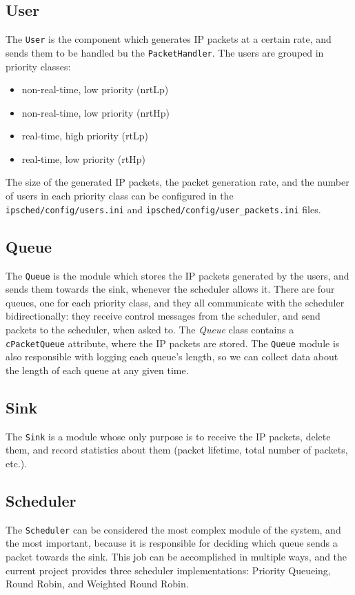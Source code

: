 \documentclass[12pt]{article}
\begin{document}
        \subsection{User}
        The \verb|User| is the component which generates IP packets at a certain rate, and sends them to be handled bu the \verb|PacketHandler|. The users are grouped in priority classes:
        \begin{itemize}
            \item{non-real-time, low priority (nrtLp)}
            \item{non-real-time, low priority (nrtHp)}
            \item{real-time, high priority (rtLp)}
            \item{real-time, low priority (rtHp)}
        \end{itemize}
        The size of the generated IP packets, the packet generation rate, and the number of users in each priority class can be configured in the \verb|ipsched/config/users.ini| and \verb|ipsched/config/user_packets.ini| files.

        \subsection{Queue}
        The \verb|Queue| is the module which stores the IP packets generated by the users, and sends them towards the sink, whenever the scheduler allows it. There are four queues, one for each priority class, and they all communicate with the scheduler bidirectionally: they receive control messages from the scheduler, and send packets to the scheduler, when asked to.
        The \textit{Queue} class contains a \verb|cPacketQueue| attribute, where the IP packets are stored.
        The \verb|Queue| module is also responsible with logging each queue's length, so we can collect data about the length of each queue at any given time.
        
        \subsection{Sink}
        The \verb|Sink| is a module whose only purpose is to receive the IP packets, delete them, and record statistics about them (packet lifetime, total number of packets, etc.).

        \subsection{Scheduler}
        The \verb|Scheduler| can be considered the most complex module of the system, and the most important, because it is responsible for deciding which queue sends a packet towards the sink. This job can be accomplished in multiple ways, and the current project provides three scheduler implementations: Priority Queueing, Round Robin, and Weighted Round Robin.
\end{document}
